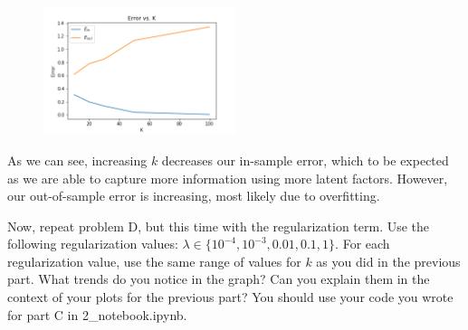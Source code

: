 \begin{solution}
	\begin{figure}[H]
        \begin{center}
        \includegraphics[width=0.5\textwidth]{2d.png}
        \end{center}
        \end{figure}
		As we can see, increasing $k$ decreases our in-sample error, which to be expected as we are able to capture more information using more latent factors. However, our out-of-sample error is increasing, most likely due to overfitting.
\end{solution}

\problem[5]
Now, repeat problem D, but this time with the regularization term. Use the following regularization values: $\lambda \in \{10^{-4}, 10^{-3}, 0.01, 0.1, 1\}$. For each regularization value, use the same range of values for $k$ as you did in the previous part. What trends do you notice in the graph? Can you explain them in the context of your plots for the previous part? You should use your code you wrote for part C in 2_notebook.ipynb.

